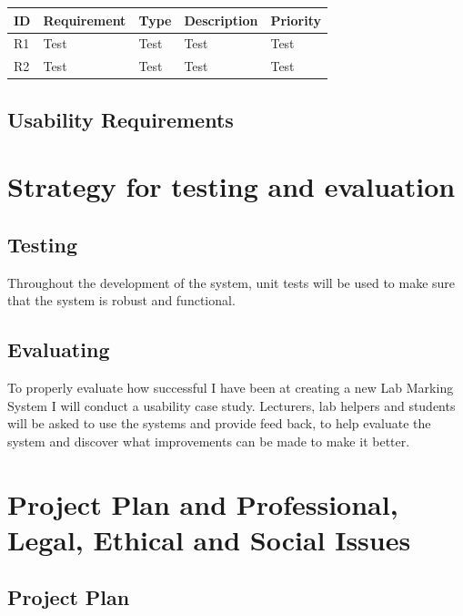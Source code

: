 \documentclass[12pt]{article}  %
\theoremstyle{definition}
\theoremstyle{remark}
\begin{document}
\begin{tabularx}{\textwidth}{|l|X|X|X|X|}
\hline
  \textbf{ID} & \textbf{Requirement} & \textbf{Type} & \textbf{Description} & \textbf{Priority} 
\\
\hline
R1&Test&Test&Test&Test\\ \hline
R2&Test&Test&Test&Test\\ \hline


\end{tabularx}

\subsection{Usability Requirements}


\newpage
\section{Strategy for testing and evaluation}

\subsection{Testing}
Throughout the development of the system, unit tests will be used to make sure that the system is robust and functional. \\

\subsection{Evaluating}
To properly evaluate how successful I have been at creating a new Lab Marking System I will conduct a usability case study. Lecturers, lab helpers and students will be asked to use the systems and provide feed back, to help evaluate the system and discover what improvements can be made to make it better.


\newpage
\section{Project Plan and Professional, Legal, Ethical and Social Issues}

\subsection{Project Plan}
\end{document}
